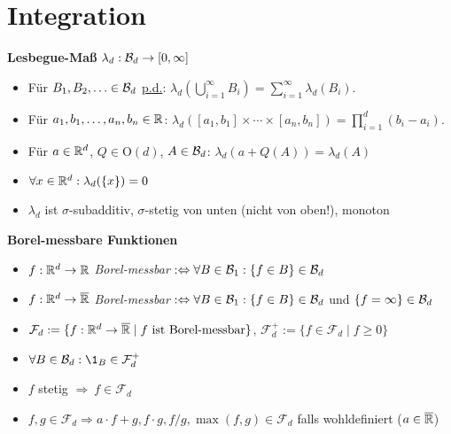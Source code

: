 \section{Integration}

\textbf{Lesbegue-Maß} $\lambda_d: \mathcal{B}_{d}\to [0,\infty]$
\begin{itemize}
\item Für $B_1,B_2,\ldots\in\mathcal{B}_{d}$ \underline{p.d.}:
$\lambda_d(\bigcup_{i=1}^{\infty} B_i)=\sum_{i=1}^{\infty}\lambda_d(B_i)$.

\item Für $a_1,b_1,\ldots,a_n,b_n\in\mathbb{R}$:
$\lambda_d([a_1,b_1]\times\cdots\times[a_n,b_n])=\prod_{i=1}^{d}(b_i-a_i)$.

\item Für $a\in\mathbb{R}^d$, $Q\in\mathrm{O}(d)$, $A\in\mathcal{B}_{d}$: 
$\lambda_d(a+Q(A))=\lambda_d(A)$

\item $\forall x\in\mathbb{R}^d: \lambda_d(\{x\})=0$

\item $\lambda_d$ ist $\sigma$-subadditiv, $\sigma$-stetig von unten
(nicht von oben!), monoton
\end{itemize}

\textbf{Borel-messbare Funktionen}
\begin{itemize}
\item $f:\mathbb{R}^d\to\mathbb{R}$ \textit{Borel-messbar}
$:\Leftrightarrow\forall B\in\mathcal{B}_{1}: \{f\in B\}\in\mathcal{B}_{d}$

\item $f:\mathbb{R}^d\to\overline{\mathbb{R}}$ \textit{Borel-messbar}
$:\Leftrightarrow\forall B\in\mathcal{B}_{1}: \{f\in B\}\in\mathcal{B}_{d}$ und $\{f=\infty\}\in\mathcal{B}_{d}$

\item $\mathcal{F}_d:=\{f:\mathbb{R}^d\to\overline{\mathbb{R}}\mid f \text{ ist Borel-messbar}\}$,
$\mathcal{F}_d^+ :=\{f\in\mathcal{F}_d\mid f\geq 0\}$

\item $\forall B\in\B{d}: \1_B\in\mathcal{F}_d^+$

\item $f$ stetig $\Rightarrow\ f\in\mathcal{F}_d$

\item $f,g\in\mathcal{F}_d\Rightarrow a\cdot f+g, f\cdot g, f/g,
\operatorname{max}(f,g)\in\mathcal{F}_d$ falls wohldefiniert ($a\in\overline{\mathbb{R}}$)
\end{itemize}

